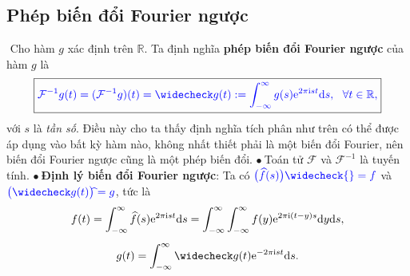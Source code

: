 \documentclass[10pt, a4paper]{article}
\begin{document}
	\subsection{Phép biến đổi Fourier ngược}
	\vspace{2mm}
	\quad\,\,Cho hàm $g$ xác định trên $\mathbb R$. Ta định nghĩa \textbf{\color{red}phép biến đổi Fourier ngược} của hàm $g$ là $$\boxed{\color{blue}\mathcal F^{-1}g(t)=(\mathcal F^{-1}g)(t)=\widecheck g(t):=\displaystyle\int_{-\infty}^\infty g(s)\mathrm e^{2\pi\text{i}st}\text{d}s,~~\forall t\in\mathbb R,}$$
	với $s$ là \textit{tần số}.\vskip7pt
	Điều này cho ta thấy định nghĩa tích phân như trên có thể được áp dụng vào bất kỳ hàm nào, không nhất thiết phải là một biến đổi Fourier, nên biến đổi Fourier ngược cũng là một phép biến đổi.\vskip7pt
	$\bullet~$Toán tử $\mathcal F$ và $\mathcal F^{-1}$ là tuyến tính.\vskip7pt
	$\bullet~$\textbf{Định lý biến đổi Fourier ngược}: Ta có $\color{blue}\big(\widehat f(s)\big)\widecheck{}=f$ và $\color{blue}\big(\widecheck g(t)\big)\widehat{}=g$, tức là \begin{gather*}
		f(t)=\int_{-\infty}^\infty\widehat f(s)\mathrm e^{2\pi\mathrm ist}\mathrm ds=\int_{-\infty}^\infty\int_{-\infty}^\infty f(y)\mathrm e^{2\pi\mathrm i(t-y)s}\mathrm dy\mathrm ds,\\
		\noalign{\vskip5pt}
		g(t)=\int_{-\infty}^\infty\widecheck g(t)\mathrm e^{-2\pi\mathrm ist}\mathrm ds.
	\end{gather*}
	
\end{document}
